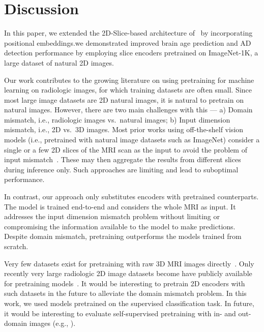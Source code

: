 \section{Discussion}\label{sec:discussion}




In this paper, we extended the 2D-Slice-based architecture of~\cite{gupta2021improved} by incorporating positional embeddings.we demonstrated improved brain age prediction and AD detection performance by employing slice encoders pretrained on ImageNet-1K, a large dataset of natural 2D images.

Our work contributes to the growing literature on using pretraining for machine learning on radiologic images, for which training datasets are often small. Since most large image datasets are 2D natural images, it is natural to pretrain on natural images.  However, there are two main challenges with this --- a) Domain mismatch, i.e., radiologic images vs.\ natural images; b) Input dimension mismatch, i.e., 2D vs.\ 3D images. Most prior works using off-the-shelf vision models (i.e., pretrained with natural image datasets such as ImageNet) consider a single or a few 2D slices of the MRI scan as the input to avoid the problem of input mismatch~\cite{hon2017towards,valliani2017deep,islam2018brain,MRISignBrainAge}. These may then aggregate the results from different slices during inference only. Such approaches are limiting and lead to suboptimal performance.

In contrast, our approach only substitutes encoders with pretrained counterparts. The model is trained end-to-end and considers the whole MRI as input. It addresses the input dimension mismatch problem without limiting or compromising the information available to the model to make predictions. Despite domain mismatch, pretraining outperforms the models trained from scratch.

Very few datasets exist for pretraining with raw 3D MRI images directly~\cite{chen2019med3d}. Only recently very large radiologic 2D image datasets become have publicly available for pretraining models~\cite{doi:10.1148/ryai.210315,alzubaidi2021mednet}. It would be interesting to pretrain 2D encoders with such datasets in the future to alleviate the domain mismatch problem. In this work, we used models pretrained on the supervised classification task. In future, it would be interesting to evaluate self-supervised pretraining with in- and out-domain images (e.g., \cite{dhinagar2022evaluation}).
